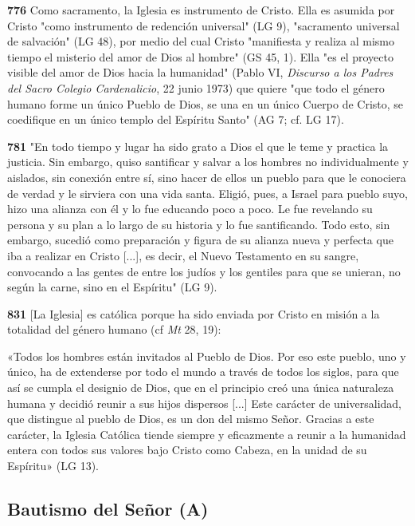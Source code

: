 \documentclass[]{article}
\begin{document}
\textbf{776} Como sacramento, la Iglesia es instrumento de Cristo. Ella
es asumida por Cristo "como instrumento de redención universal" (LG 9),
"sacramento universal de salvación" (LG 48), por medio del cual Cristo
"manifiesta y realiza al mismo tiempo el misterio del amor de Dios al
hombre" (GS 45, 1). Ella "es el proyecto visible del amor de Dios hacia
la humanidad" (Pablo VI, \emph{Discurso a los Padres del Sacro Colegio
Cardenalicio}, 22 junio 1973) que quiere "que todo el género humano
forme un único Pueblo de Dios, se una en un único Cuerpo de Cristo, se
coedifique en un único templo del Espíritu Santo" (AG 7; cf. LG 17).

\textbf{781} "En todo tiempo y lugar ha sido grato a Dios el que le teme
y practica la justicia. Sin embargo, quiso santificar y salvar a los
hombres no individualmente y aislados, sin conexión entre sí, sino hacer
de ellos un pueblo para que le conociera de verdad y le sirviera con una
vida santa. Eligió, pues, a Israel para pueblo suyo, hizo una alianza
con él y lo fue educando poco a poco. Le fue revelando su persona y su
plan a lo largo de su historia y lo fue santificando. Todo esto, sin
embargo, sucedió como preparación y figura de su alianza nueva y
perfecta que iba a realizar en Cristo {[}...{]}, es decir, el Nuevo
Testamento en su sangre, convocando a las gentes de entre los judíos y
los gentiles para que se unieran, no según la carne, sino en el
Espíritu" (LG 9).

\textbf{831} {[}La Iglesia{]} es católica porque ha sido enviada por
Cristo en misión a la totalidad del género humano (cf \emph{Mt} 28, 19):

«Todos los hombres están invitados al Pueblo de Dios. Por eso este
pueblo, uno y único, ha de extenderse por todo el mundo a través de
todos los siglos, para que así se cumpla el designio de Dios, que en el
principio creó una única naturaleza humana y decidió reunir a sus hijos
dispersos {[}...{]} Este carácter de universalidad, que distingue al
pueblo de Dios, es un don del mismo Señor. Gracias a este carácter, la
Iglesia Católica tiende siempre y eficazmente a reunir a la humanidad
entera con todos sus valores bajo Cristo como Cabeza, en la unidad de su
Espíritu» (LG 13).



\subsection{Bautismo del Señor (A)}\label{bautismo-del-seuxf1or-a}
\end{document}
